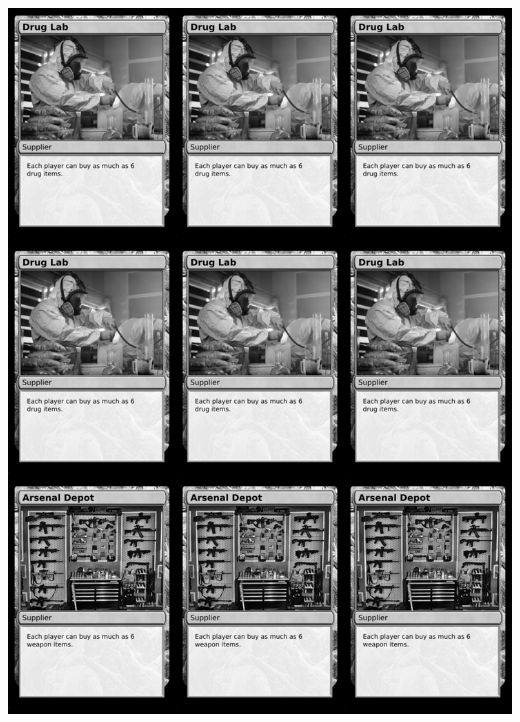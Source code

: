 \documentclass[a4paper]{article}
\begin{document}
\begin{center}
	\centering
	\includegraphics[width=190.5mm,height=266.7mm]{output/temp/page21.png}
\end{center}

\newpage
\end{document}
